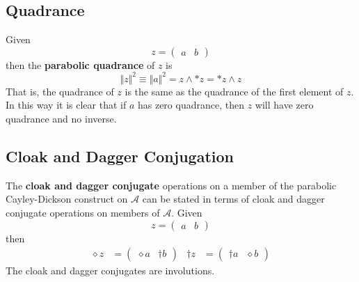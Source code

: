 \subsection{Quadrance}
Given
\begin{equation}
    z = \begin{pmatrix}
        a & b
    \end{pmatrix}
\end{equation}
then the \textbf{parabolic quadrance} of $z$ is
\begin{equation}
    \Vert z \Vert^{2} \equiv \Vert a \Vert^{2} = z \wedge {\ast z} = {\ast z} \wedge z
\end{equation}
That is, the quadrance of $z$ is the same as the quadrance of the first element of $z$. In this way it is clear that if $a$ has zero quadrance, then $z$ will have zero quadrance and no inverse.
\subsection{Cloak and Dagger Conjugation}
The \textbf{cloak and dagger conjugate} operations on a member of the parabolic Cayley-Dickson construct on $\mathcal{A}$ can be stated in terms of cloak and dagger conjugate operations on members of $\mathcal{A}$. Given
\begin{equation}
    z = \begin{pmatrix}
        a & b
    \end{pmatrix}
\end{equation}
then
\begin{align}
    {\diamond z} &= \begin{pmatrix}
        {\diamond a} & {\dagger b}
    \end{pmatrix} &
    {\dagger z} &= \begin{pmatrix}
        {\dagger a} & {\diamond b}
    \end{pmatrix}
\end{align}
The cloak and dagger conjugates are involutions. 
